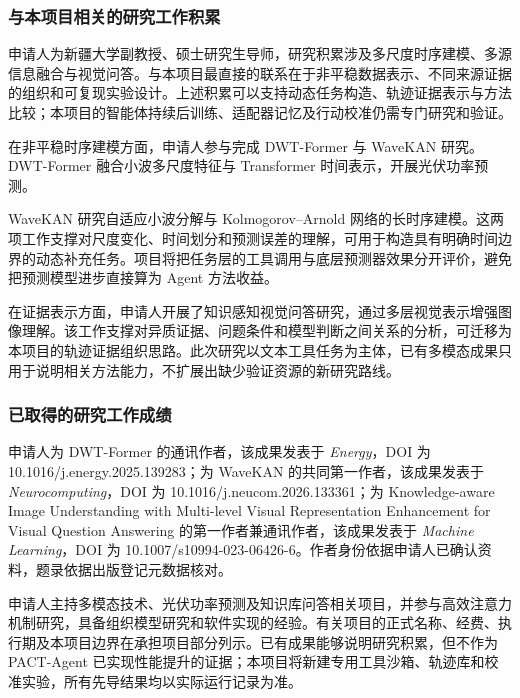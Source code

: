 \justifying
\NSFCBodyText

\subsubsection{与本项目相关的研究工作积累}

申请人为新疆大学副教授、硕士研究生导师，研究积累涉及多尺度时序建模、多源信息融合与视觉问答。与本项目最直接的联系在于非平稳数据表示、不同来源证据的组织和可复现实验设计。上述积累可以支持动态任务构造、轨迹证据表示与方法比较；本项目的智能体持续后训练、适配器记忆及行动校准仍需专门研究和验证。

在非平稳时序建模方面，申请人参与完成 DWT-Former 与 WaveKAN 研究。DWT-Former 融合小波多尺度特征与 Transformer 时间表示，开展光伏功率预测\cite{dwtformer}。

WaveKAN 研究自适应小波分解与 Kolmogorov--Arnold 网络的长时序建模\cite{wavekan}。这两项工作支撑对尺度变化、时间划分和预测误差的理解，可用于构造具有明确时间边界的动态补充任务。项目将把任务层的工具调用与底层预测器效果分开评价，避免把预测模型进步直接算为 Agent 方法收益。

在证据表示方面，申请人开展了知识感知视觉问答研究，通过多层视觉表示增强图像理解\cite{knowledgevqa}。该工作支撑对异质证据、问题条件和模型判断之间关系的分析，可迁移为本项目的轨迹证据组织思路。此次研究以文本工具任务为主体，已有多模态成果只用于说明相关方法能力，不扩展出缺少验证资源的新研究路线。

\subsubsection{已取得的研究工作成绩}

申请人为 DWT-Former 的通讯作者，该成果发表于 \textit{Energy}，DOI 为 10.1016/j.energy.2025.139283；为 WaveKAN 的共同第一作者，该成果发表于 \textit{Neurocomputing}，DOI 为 10.1016/j.neucom.2026.133361；为 Knowledge-aware Image Understanding with Multi-level Visual Representation Enhancement for Visual Question Answering 的第一作者兼通讯作者，该成果发表于 \textit{Machine Learning}，DOI 为 10.1007/s10994-023-06426-6。作者身份依据申请人已确认资料，题录依据出版登记元数据核对。

申请人主持多模态技术、光伏功率预测及知识库问答相关项目，并参与高效注意力机制研究，具备组织模型研究和软件实现的经验。有关项目的正式名称、经费、执行期及本项目边界在承担项目部分列示。已有成果能够说明研究积累，但不作为 PACT-Agent 已实现性能提升的证据；本项目将新建专用工具沙箱、轨迹库和校准实验，所有先导结果均以实际运行记录为准。

